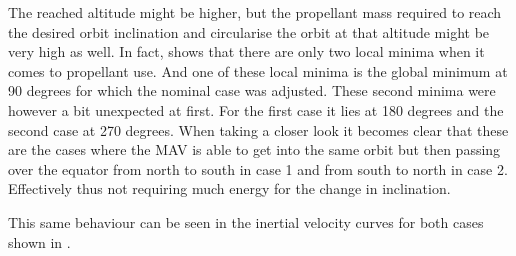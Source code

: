 \noindent
The reached altitude might be higher, but the propellant mass required to reach the desired orbit inclination and circularise the orbit at that altitude might be very high as well. In fact,  shows that there are only two local minima when it comes to propellant use. And one of these local minima is the global minimum at 90 degrees for which the nominal case was adjusted. These second minima were however a bit unexpected at first. For the first case it lies at 180 degrees and the second case at 270 degrees. When taking a closer look it becomes clear that these are the cases where the \ac{MAV} is able to get into the same orbit but then passing over the equator from north to south in case 1 and from south to north in case 2. Effectively thus not requiring much energy for the change in inclination.

This same behaviour can be seen in the inertial velocity curves for both cases shown in . 



